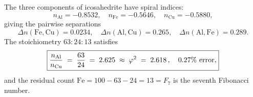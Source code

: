 

\begin{proposition}
\label{P11:prop:icosahedrite}
The three components of icosahedrite have spiral indices:
\begin{equation}
  n_{\mathrm{Al}} = -0.8532, \quad
  n_{\mathrm{Fe}} = -0.5646, \quad
  n_{\mathrm{Cu}} = -0.5880,
  \label{P11:eq:icosahedrite_indices}
\end{equation}
giving the pairwise separations
\begin{equation}
  \Delta n(\mathrm{Fe,Cu}) = 0.0234, \quad
  \Delta n(\mathrm{Al,Cu}) = 0.265, \quad
  \Delta n(\mathrm{Al,Fe}) = 0.289.
  \label{P11:eq:icosahedrite_deltas}
\end{equation}
The stoichiometry $63:24:13$ satisfies
\begin{equation}
  \boxed{\frac{n_{\mathrm{Al}}}{n_{\mathrm{Cu}}} \;=\; \frac{63}{24}
  \;=\; 2.625 \;\approx\; \varphi^2 \;=\; 2.618\,,\quad
  0.27\%\ \text{error},}
  \label{P11:eq:icosahedrite_phi2}
\end{equation}
and the residual count $\mathrm{Fe} = 100 - 63 - 24 = 13 = F_7$
is the seventh Fibonacci number.
\end{proposition}


